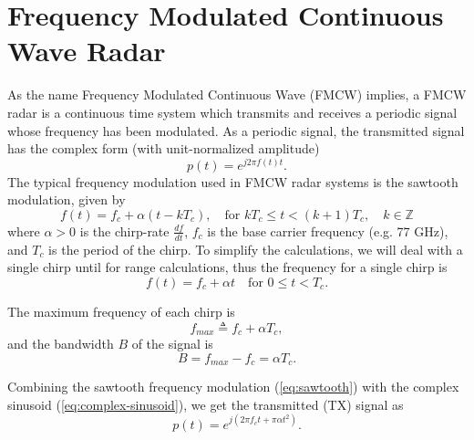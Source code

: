 \chapter{Frequency Modulated Continuous Wave Radar}
As the name Frequency Modulated Continuous Wave (FMCW) implies, a FMCW radar is
a continuous time system which transmits and receives a periodic signal whose 
frequency has been modulated. As a periodic signal, the transmitted signal has
the complex form (with unit-normalized amplitude)
\begin{equation}
	\label{eq:complex-sinusoid}
	p(t) = e^{j2\pi f(t)t}.
\end{equation}
The typical frequency modulation used in FMCW radar systems is the sawtooth
modulation, given by
\cite{iovescufundamentals, wang2008digital}
\begin{equation}
	\label{eq:sawtooth}
	f(t) = f_c + \alpha (t - kT_c), \quad\text{for } kT_c \leq t < (k+1)T_c, \quad
	k \in \mathbb{Z}
\end{equation}
where $\alpha > 0$ is the chirp-rate  $\frac{df}{dt}$, $f_c$ is the base
carrier frequency (e.g. 77 GHz), and $T_c$ is the period of the chirp. To
simplify the calculations, we will deal with a single chirp until for range
calculations, thus the frequency for a single chirp is 
\begin{equation}
	f(t) = f_c + \alpha t \quad\text{for } 0\leq t < T_c.
\end{equation}

The maximum frequency of each chirp is 
\begin{equation}
	f_{max} \triangleq f_c + \alpha T_c,
\end{equation}
and the bandwidth $B$ of the signal is
\begin{equation}
	B = f_{max} - f_c = \alpha T_c.
\end{equation}

Combining the sawtooth frequency modulation (\ref{eq:sawtooth}) with the complex
sinusoid (\ref{eq:complex-sinusoid}), we get
the transmitted (TX) signal as
\begin{equation}
	p(t) = e^{j(2\pi f_c t+ \pi \alpha t^2)}.
\end{equation}

